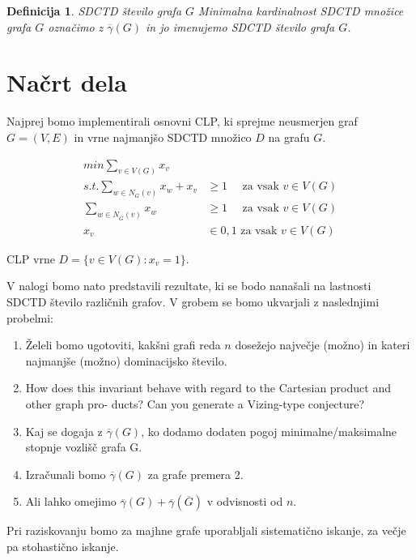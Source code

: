 \documentclass[12pt]{article}
\newtheorem{definition}{Definicija}
\begin{document}
\begin{definition}{SDCTD število grafa $G$}
    Minimalna kardinalnost SDCTD množice grafa $G$ označimo z $\overline{\gamma}(G)$ in jo imenujemo SDCTD število grafa $G$. 
\end{definition}

\section{Načrt dela}
Najprej bomo implementirali osnovni CLP, ki sprejme neusmerjen graf $G = (V,E)$ in vrne najmanjšo SDCTD množico $D$ na grafu $G$. 

\begin{align*}
min \sum_{v \in V(G)} x_v &\\
s.t. \sum_{w \in N_{G}(v)} x_w + x_v &\geq 1 \quad \text{ za vsak } v \in V(G) \\
\sum_{w \in N_{\overline{G}}(v)} x_w &\geq 1 \quad \text{ za vsak } v \in V(G) \\
x_v &\in {0,1} \text{ za vsak } v \in V(G)
\end{align*}

\noindent CLP vrne $D = \{v \in V(G): x_v = 1\}$. 

\vspace{12pt}
\noindent V nalogi bomo nato predstavili rezultate, ki se bodo nanašali na lastnosti SDCTD število različnih grafov. V grobem se bomo ukvarjali z naslednjimi probelmi:
\begin{enumerate}
    \item Želeli bomo ugotoviti, kakšni grafi reda $n$ dosežejo največje (možno) in kateri najmanjše (možno) dominacijsko število.
    \item How does this invariant behave with regard to the Cartesian product and other graph pro-
    ducts? Can you generate a Vizing-type conjecture?
    \item Kaj se dogaja z $\overline{\gamma}(G)$, ko dodamo dodaten pogoj minimalne/maksimalne stopnje vozlišč grafa G.
    \item Izračunali bomo $\overline{\gamma}(G)$ za grafe premera 2.
    \item Ali lahko omejimo $\overline{\gamma}(G) + \overline{\gamma}(\overline{G})$ v odvisnosti od $n$.
\end{enumerate} 

Pri raziskovanju bomo za majhne grafe uporabljali sistematično iskanje, za večje pa stohastično iskanje.
\end{document}

